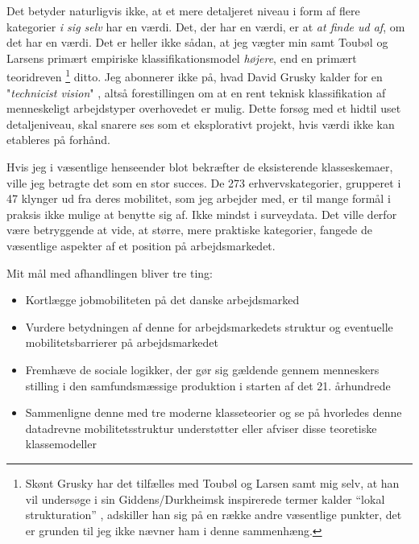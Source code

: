 Det betyder naturligvis ikke, at et mere detaljeret niveau i form af flere kategorier \emph{i sig selv} har en værdi. Det, der har en værdi, er at \emph{at finde ud af}, om det har en værdi.  Det er heller ikke sådan, at jeg vægter min samt Toubøl og Larsens primært empiriske klassifikationsmodel \emph{højere}, end en primært teoridreven%
%
		\footnote{ Skønt Grusky har det tilfælles med Toubøl og Larsen samt mig selv, at han vil undersøge i sin Giddens/Durkheimsk inspirerede termer kalder  “lokal strukturation” \parencite[207]{Grusky2001}, adskiller han sig på en række andre væsentlige punkter, det er grunden til jeg ikke nævner ham i denne sammenhæng.}%
%
 ditto. Jeg abonnerer ikke på, hvad David Grusky kalder for en "\emph{technicist vision}" \parencite[215:fodnote 5]{Grusky2001}, altså forestillingen om at en rent teknisk klassifikation af menneskeligt arbejdstyper overhovedet er mulig. 
 Dette forsøg med et hidtil uset detaljeniveau, skal snarere ses som et eksplorativt projekt, hvis værdi ikke kan etableres på forhånd. 

Hvis jeg i væsentlige henseender blot bekræfter de eksisterende klasseskemaer, ville jeg betragte det som en stor succes. De 273 erhvervskategorier, grupperet i 47 klynger ud fra deres mobilitet, som jeg arbejder med, er til mange formål i praksis ikke mulige at benytte sig af. Ikke mindst i surveydata. Det ville derfor være betryggende at vide, at større, mere praktiske kategorier, fangede de væsentlige aspekter af et position på arbejdsmarkedet.


Mit mål med afhandlingen bliver tre ting: 

%
\begin{itemize}
 \itemsep -0.5em
 	\item Kortlægge jobmobiliteten på det danske arbejdsmarked 
 	\item Vurdere betydningen af denne for arbejdsmarkedets struktur og eventuelle mobilitetsbarrierer på arbejdsmarkedet
 	\item Fremhæve de sociale logikker, der gør sig gældende gennem menneskers stilling i den samfundsmæssige produktion i starten af det 21. århundrede  
 	\item Sammenligne denne med tre moderne klasseteorier og se på hvorledes denne datadrevne mobilitetsstruktur understøtter eller afviser disse teoretiske klassemodeller  
\end{itemize}
%



